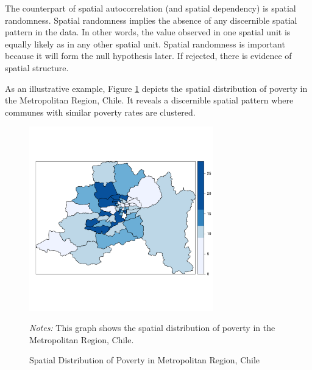 \documentclass[english,12pt]{book}\usepackage[]{graphicx}\usepackage[]{xcolor}
\newenvironment{knitrout}{}{} %
\begin{document}
The counterpart of spatial autocorrelation (and spatial dependency) is spatial randomness. Spatial randomness implies the absence of any discernible spatial pattern in the data. In other words, the value observed in one spatial unit is equally likely as in any other spatial unit. Spatial randomness is important because it will form the null hypothesis later. If rejected, there is evidence of spatial structure.

As an illustrative example, Figure \ref{fig:MR} depicts the spatial distribution of poverty in the Metropolitan Region, Chile. It reveals a discernible spatial pattern where communes with similar poverty rates are clustered.
\begin{figure}[ht]
  \caption{Spatial Distribution of Poverty in Metropolitan Region, Chile}
    \label{fig:MR}
    \centering
    	\begin{minipage}{.9\linewidth}
\begin{knitrout}
\color{fgcolor}

{\centering \includegraphics[width=8cm,height=8cm]{figure/MetroRegion-1} 

}


\end{knitrout}
\footnotesize
		\emph{Notes:} This graph shows the spatial distribution of poverty in the Metropolitan Region, Chile. 
	\end{minipage}	
\end{figure}
\end{document}
